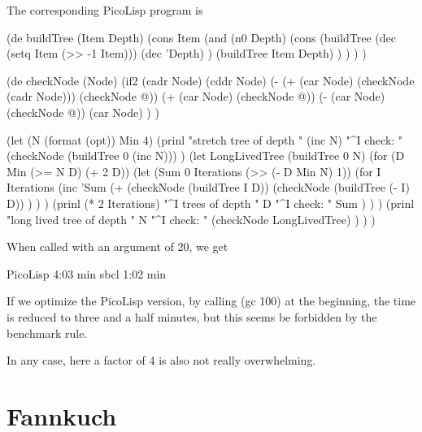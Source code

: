 The corresponding PicoLisp program is

\begin{wideverbatim}
   (de buildTree (Item Depth)
      (cons Item
         (and
            (n0 Depth)
            (cons
               (buildTree
                  (dec (setq Item (>> -1 Item)))
                  (dec 'Depth) )
               (buildTree Item Depth) ) ) ) )

   (de checkNode (Node)
      (if2 (cadr Node) (cddr Node)
         (- (+ (car Node) (checkNode (cadr Node))) (checkNode @))
         (+ (car Node) (checkNode @))
         (- (car Node) (checkNode @))
         (car Node) ) )

\end{wideverbatim}

\begin{wideverbatim}

   (let (N (format (opt))  Min 4)
      (prinl
         "stretch tree of depth "
         (inc N)
         "^I check: "
         (checkNode (buildTree 0 (inc N))) )
      (let LongLivedTree (buildTree 0 N)
         (for (D Min (>= N D) (+ 2 D))
            (let (Sum 0  Iterations (>> (- D Min N) 1))
               (for I Iterations
                  (inc 'Sum
                     (+
                        (checkNode (buildTree I D))
                        (checkNode (buildTree (- I) D)) ) ) )
               (prinl
                  (* 2 Iterations)
                  "^I trees of depth "
                  D
                  "^I check: "
                  Sum ) ) )
         (prinl
            "long lived tree of depth "
            N
            "^I check: "
            (checkNode LongLivedTree) ) ) )
\end{wideverbatim}

When called with an argument of 20, we get
\begin{wideverbatim}
   PicoLisp    4:03 min
   sbcl        1:02 min
\end{wideverbatim}

If we optimize the PicoLisp version, by calling (gc 100) at the beginning, the
time is reduced to three and a half minutes, but this seems be forbidden by the
benchmark rule.

In any case, here a factor of 4 is also not really overwhelming.

\section{Fannkuch}
\label{sec:need-speed-fannkuch}

